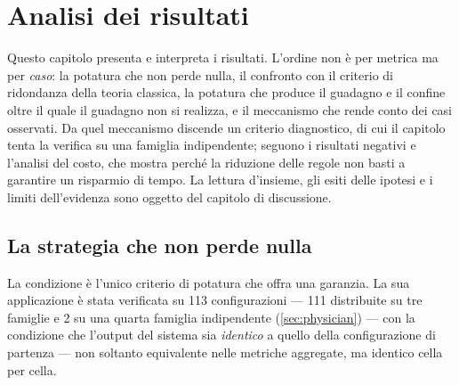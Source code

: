 \chapter{Analisi dei risultati}\label{chap:results}


\noindent Questo capitolo presenta e interpreta i risultati. L'ordine non è per metrica ma per
\emph{caso}: la potatura che non perde nulla, il confronto con il criterio di ridondanza della
teoria classica, la potatura che produce il guadagno e il confine oltre il quale il guadagno non
si realizza, e il meccanismo che rende conto dei casi osservati. Da quel meccanismo discende un
criterio diagnostico, di cui il capitolo tenta la verifica su una famiglia indipendente; seguono i
risultati negativi e l'analisi del costo, che mostra perché la riduzione delle regole non basti a
garantire un risparmio di tempo. La lettura d'insieme, gli esiti delle ipotesi e i limiti
dell'evidenza sono oggetto del capitolo di discussione.

\section{La strategia che non perde nulla}\label{sec:res-vetocover}

La condizione \Vtwo{} è l'unico criterio di potatura che offra una garanzia. La sua applicazione
è stata verificata su \num{113} configurazioni --- \num{111} distribuite su tre famiglie e
\num{2} su una quarta famiglia indipendente (\autoref{sec:physician}) --- con la condizione
che l'output del sistema sia \emph{identico} a quello della configurazione di partenza --- non
soltanto equivalente nelle metriche aggregate, ma identico cella per cella.

